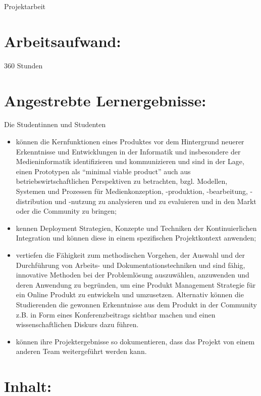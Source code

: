 Projektarbeit

\section*{Arbeitsaufwand:}\label{arbeitsaufwand-10}

360 Stunden

\section*{Angestrebte
Lernergebnisse:}\label{angestrebte-lernergebnisse-9}

Die Studentinnen und Studenten

\begin{itemize}
\tightlist
\item
  können die Kernfunktionen eines Produktes vor dem Hintergrund neuerer
  Erkenntnisse und Entwicklungen in der Informatik und insbesondere der
  Medieninformatik identifizieren und kommunizieren und sind in der
  Lage, einen Prototypen als ``minimal viable product'' auch aus
  betriebswirtschaftlichen Perspektiven zu betrachten, bzgl. Modellen,
  Systemen und Prozessen für Medienkonzeption, -produktion,
  -bearbeitung, -distribution und -nutzung zu analysieren und zu
  evaluieren und in den Markt oder die Community zu bringen;
\item
  kennen Deployment Strategien, Konzepte und Techniken der
  Kontinuierlichen Integration und können diese in einem spezifischen
  Projektkontext anwenden;
\item
  vertiefen die Fähigkeit zum methodischen Vorgehen, der Auswahl und der
  Durchführung von Arbeits- und Dokumentationstechniken und sind fähig,
  innovative Methoden bei der Problemlösung auszuwählen, anzuwenden und
  deren Anwendung zu begründen, um eine Produkt Management Strategie für
  ein Online Produkt zu entwickeln und umzusetzen. Alternativ können die
  Studierenden die gewonnen Erkenntnisse aus dem Produkt in der
  Community z.B. in Form eines Konferenzbeitrags sichtbar machen und
  einen wissenschaftlichen Diskurs dazu führen.
\item
  können ihre Projektergebnisse so dokumentieren, dass das Projekt von
  einem anderen Team weitergeführt werden kann.
\end{itemize}

\section*{Inhalt:}\label{inhalt-9}

